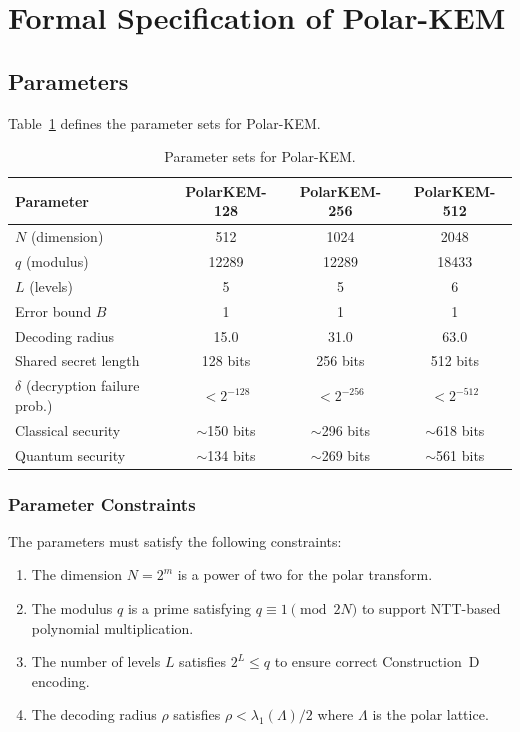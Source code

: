 \documentclass[11pt,a4paper]{article}
\newcommand{\polarKem}{\textsf{Polar-KEM}\xspace}
\begin{document}
\section{Formal Specification of \polarKem}\label{sec:specification}

\subsection{Parameters}\label{sec:parameters}

Table~\ref{tab:params} defines the parameter sets for \polarKem.

\begin{table}[H]
\centering
\caption{Parameter sets for \polarKem.}
\label{tab:params}
\begin{tabular}{@{}lccc@{}}
\toprule
\textbf{Parameter} & \textbf{PolarKEM-128} & \textbf{PolarKEM-256} & \textbf{PolarKEM-512} \\
\midrule
$N$ (dimension) & 512 & 1024 & 2048 \\
$q$ (modulus) & 12289 & 12289 & 18433 \\
$L$ (levels) & 5 & 5 & 6 \\
Error bound $B$ & 1 & 1 & 1 \\
Decoding radius & 15.0 & 31.0 & 63.0 \\
Shared secret length & 128 bits & 256 bits & 512 bits \\
$\delta$ (decryption failure prob.) & $< 2^{-128}$ & $< 2^{-256}$ & $< 2^{-512}$ \\
Classical security & $\sim$150 bits & $\sim$296 bits & $\sim$618 bits \\
Quantum security & $\sim$134 bits & $\sim$269 bits & $\sim$561 bits \\
\bottomrule
\end{tabular}
\end{table}

\subsubsection{Parameter Constraints}

The parameters must satisfy the following constraints:
\begin{enumerate}[leftmargin=2em]
\item The dimension $N = 2^m$ is a power of two for the polar transform.
\item The modulus $q$ is a prime satisfying $q \equiv 1 \pmod{2N}$ to support NTT-based polynomial multiplication.
\item The number of levels $L$ satisfies $2^L \leq q$ to ensure correct Construction~D encoding.
\item The decoding radius $\rho$ satisfies $\rho < \lambda_1(\Lambda) / 2$ where $\Lambda$ is the polar lattice.
\end{enumerate}
\end{document}

